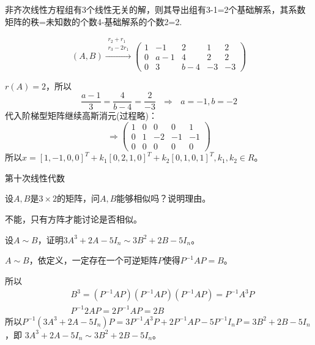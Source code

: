 \documentclass[a4paper]{report}
\begin{document}
\begin{jie}
非齐次线性方程组有3个线性无关的解，则其导出组有3-1=2个基础解系，其系数矩阵的秩=未知数的个数4-基础解系的个数2=2.

\begin{equation*}
(A,B)
\xrightarrow{\substack{r_{2}+r_{1}\\ r_3-2r_1}}
{\begin{pmatrix}
1&-1&2&1&2\\
0&a-1&4&2&2\\
0&3&b-4&-3&-3\end{pmatrix}
}
\end{equation*}

$r(A)=2$，所以
\begin{equation*}
\frac{a-1}{3}=\frac{4}{b-4}=\frac{2}{-3}~~~\Rightarrow~~~a=-1,b=-2
\end{equation*}
代入阶梯型矩阵继续高斯消元(过程略)：
\begin{equation*}
\Rightarrow
\begin{pmatrix}
1&0&0&0&1\\
0&1&-2&-1&-1\\
0&0&0&0&0
\end{pmatrix}
\end{equation*}
所以$x=[1,-1,0,0]^T+k_{1}[0,2,1,0]^T+k_2[0,1,0,1]^T,k_1,k_2\in R$。
\end{jie}

\clearpage
{}
\hphantom{~~}\hfill {\heiti 第十次线性代数} \hfill\hphantom{~~}

\hphantom{~~}

\EX 设$A,B$是$3\times2$的矩阵，问$A,B$能够相似吗？说明理由。

\begin{jie}
不能，只有方阵才能讨论是否相似。
\end{jie}

\EX 设$A\sim B$，证明$3A^3+2A-5I_{n}\sim 3B^2+2B-5I_n$。

\begin{zhengming}
$A\sim B$，依定义，一定存在一个可逆矩阵$P$使得$P^{-1}AP=B$。

所以
\begin{align*}
&B^3=(P^{-1}AP)(P^{-1}AP)(P^{-1}AP)=P^{-1}A^3P\\
&P^{-1}2AP=2P^{-1}AP=2B
\end{align*}
所以$P^{-1}(3A^3+2A-5I_{n})P=3P^{-1}A^3P+2P^{-1}AP-5P^{-1}I_nP=3B^2+2B-5I_n$，即
$3A^3+2A-5I_{n}\sim 3B^2+2B-5I_n$。
\end{zhengming}
\end{document}
